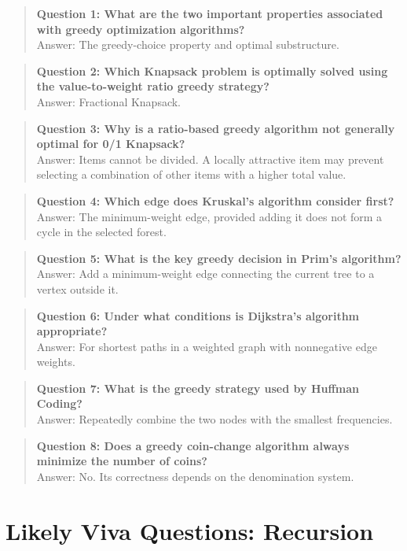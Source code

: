 \begin{quote}
\textbf{Question 1: What are the two important properties associated with greedy optimization algorithms?}\\[4pt]
Answer: The greedy-choice property and optimal substructure.
\end{quote}
\begin{quote}
\textbf{Question 2: Which Knapsack problem is optimally solved using the value-to-weight ratio greedy strategy?}\\[4pt]
Answer: Fractional Knapsack.
\end{quote}
\begin{quote}
\textbf{Question 3: Why is a ratio-based greedy algorithm not generally optimal for 0/1 Knapsack?}\\[4pt]
Answer: Items cannot be divided. A locally attractive item may prevent selecting a combination of other items with a higher total value.
\end{quote}
\begin{quote}
\textbf{Question 4: Which edge does Kruskal's algorithm consider first?}\\[4pt]
Answer: The minimum-weight edge, provided adding it does not form a cycle in the selected forest.
\end{quote}
\begin{quote}
\textbf{Question 5: What is the key greedy decision in Prim's algorithm?}\\[4pt]
Answer: Add a minimum-weight edge connecting the current tree to a vertex outside it.
\end{quote}
\begin{quote}
\textbf{Question 6: Under what conditions is Dijkstra's algorithm appropriate?}\\[4pt]
Answer: For shortest paths in a weighted graph with nonnegative edge weights.
\end{quote}
\begin{quote}
\textbf{Question 7: What is the greedy strategy used by Huffman Coding?}\\[4pt]
Answer: Repeatedly combine the two nodes with the smallest frequencies.
\end{quote}
\begin{quote}
\textbf{Question 8: Does a greedy coin-change algorithm always minimize the number of coins?}\\[4pt]
Answer: No. Its correctness depends on the denomination system.
\end{quote}
\section{Likely Viva Questions: Recursion}


